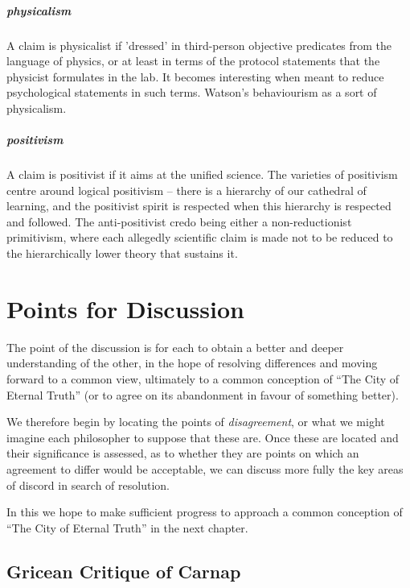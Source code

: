 \documentclass[10pt,titlepage]{book}
\begin{document}
\paragraph{physicalism} A claim is physicalist if 'dressed' in third-person objective  
predicates from the language of physics, or at least in terms of the 
protocol  statements that the physicist formulates in the lab. It becomes 
interesting when  meant to reduce psychological statements in such terms. Watson's 
behaviourism as  a sort of physicalism.
 
\paragraph{positivism} A claim is positivist if it aims at the unified science. The  
varieties of positivism centre around logical positivism -- there is a 
hierarchy  of our cathedral of learning, and the positivist spirit is respected 
when this  hierarchy is respected and followed. The anti-positivist credo being 
either a  non-reductionist primitivism, where each allegedly scientific 
claim is made not  to be reduced to the hierarchically lower theory that 
sustains it.

\chapter{Points for Discussion}

The point of the discussion is for each to obtain a better and deeper understanding of the other, in the hope of resolving differences and moving forward to a common view, ultimately to a common conception of ``The City of Eternal Truth'' (or to agree on its abandonment in favour of something better).

We therefore begin by locating the points of \emph{disagreement}, or what we might imagine each philosopher to suppose that these are.
Once these are located and their significance is assessed, as to whether they are points on which an agreement to differ would be acceptable, we can discuss more fully the key areas of discord in search of resolution.

In this we hope to make sufficient progress to approach a common conception of ``The City of Eternal Truth'' in the next chapter.

\section{Gricean Critique of Carnap}
\end{document}
